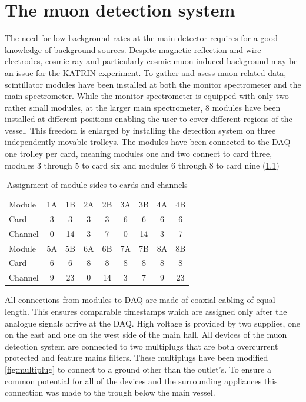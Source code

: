 
\chapter{The muon detection system}
\label{ch:The muon detection system}
  The need for low background rates at the main detector requires for a good knowledge of background sources. Despite magnetic reflection and wire electrodes, cosmic ray and particularly cosmic muon induced background may be an issue for the KATRIN experiment. To gather and asess muon related data, scintillator modules have been installed at both the monitor spectrometer and the main spectrometer. While the monitor spectrometer is equipped with only two rather small modules, at the larger main spectrometer, 8 modules have been installed at different positions enabling the user to cover different regions of the vessel. This freedom is enlarged by installing the detection system on three independently movable trolleys.
  The modules have been connected to the DAQ one trolley per card, meaning modules one and two connect to card three, modules 3 through 5 to card six and modules 6 through 8 to card nine (\ref{tab:connectionsModulesCards})
  \begin{table}
	\label{tab:connectionsModulesCards}
  	\centering
  	\begin{tabular}{| l | c c | c c | c c | c c |}
  	\hline
  		Module	& 1A	& 1B	& 2A	& 2B	& 3A	& 3B	& 4A	& 4B 	\\
  		Card	& 3	& 3	& 3	& 3	& 6	& 6	& 6	& 6	\\
  		Channel	& 0	& 14	& 3	& 7	& 0	& 14	& 3	& 7	\\
  		\hline \hline
  		Module	&5A	& 5B	& 6A	& 6B	& 7A	& 7B	& 8A	& 8B	\\
  		Card	& 6	& 6	& 8	& 8	& 8	& 8	& 8	& 8	\\
  		Channel	& 9	& 23	& 0	& 14	& 3	& 7	& 9	& 23	\\
  		\hline
  	\end{tabular}
  	\caption{Assignment of module sides to cards and channels}
  \end{table}
  All connections from modules to DAQ are made of coaxial cabling of equal length. This ensures comparable timestamps which are assigned only after the analogue signals arrive at the DAQ. High voltage is provided by two supplies, one on the east and one on the west side of the main hall.
  All devices of the muon detection system are connected to two multiplugs that are both overcurrent protected and feature mains filters. These multiplugs have been modified \ref{fig:multiplug} to connect to a ground other than the outlet's. To ensure a common potential for all of the devices and the surrounding appliances this connection was made to the trough below the main vessel.
  
